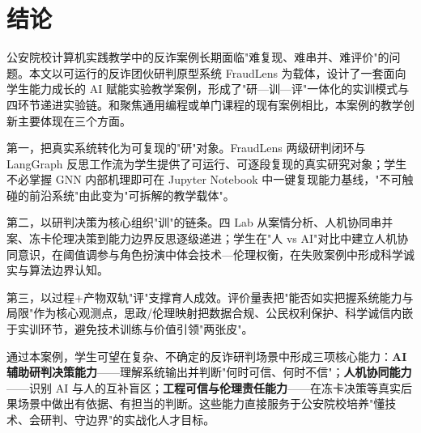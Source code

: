 \documentclass[12pt,a4paper]{ctexart}
\begin{document}
\section{结论}

公安院校计算机实践教学中的反诈案例长期面临"难复现、难串并、难评价"的问题。本文以可运行的反诈团伙研判原型系统 FraudLens 为载体，设计了一套面向学生能力成长的 AI 赋能实验教学案例，形成了"研—训—评"一体化的实训模式与四环节递进实验链。和聚焦通用编程或单门课程的现有案例相比，本案例的教学创新主要体现在三个方面。

第一，把真实系统转化为可复现的"研"对象。FraudLens 两级研判闭环与 LangGraph 反思工作流为学生提供了可运行、可逐段复现的真实研究对象；学生不必掌握 GNN 内部机理即可在 Jupyter Notebook 中一键复现能力基线，"不可触碰的前沿系统"由此变为"可拆解的教学载体"。

第二，以研判决策为核心组织"训"的链条。四 Lab 从案情分析、人机协同串并案、冻卡伦理决策到能力边界反思逐级递进；学生在"人 vs AI"对比中建立人机协同意识，在阈值调参与角色扮演中体会技术—伦理权衡，在失败案例中形成科学诚实与算法边界认知。

第三，以过程+产物双轨"评"支撑育人成效。评价量表把"能否如实把握系统能力与局限"作为核心观测点，思政/伦理映射把数据合规、公民权利保护、科学诚信内嵌于实训环节，避免技术训练与价值引领"两张皮"。

通过本案例，学生可望在复杂、不确定的反诈研判场景中形成三项核心能力：\textbf{AI 辅助研判决策能力}——理解系统输出并判断"何时可信、何时不信"；\textbf{人机协同能力}——识别 AI 与人的互补盲区；\textbf{工程可信与伦理责任能力}——在冻卡决策等真实后果场景中做出有依据、有担当的判断。这些能力直接服务于公安院校培养"懂技术、会研判、守边界"的实战化人才目标。



\end{document}
